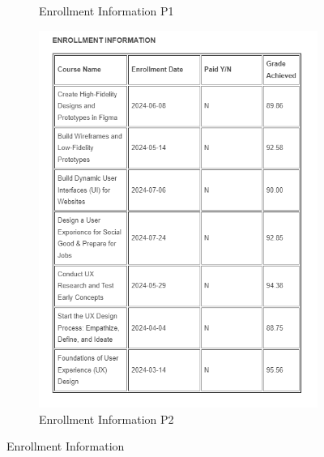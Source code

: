 \begin{itemize}
\begin{figure}[!ht]
\begin{subfigure}{0.45\textwidth}
			      \caption{Enrollment Information P1}\label{fig:enrollment_info_p1}
		      \end{subfigure}
		      \hfill
		      \begin{subfigure}{0.45\textwidth}
			      \centering
			      \includegraphics[width=\textwidth]{imgs/data-release-p2.png}
			      \caption{Enrollment Information P2}\label{fig:enrollment_info_p2}
		      \end{subfigure}

		      \caption{Enrollment Information}\label{fig:enrollment_info}
	      \end{figure}
\end{itemize}